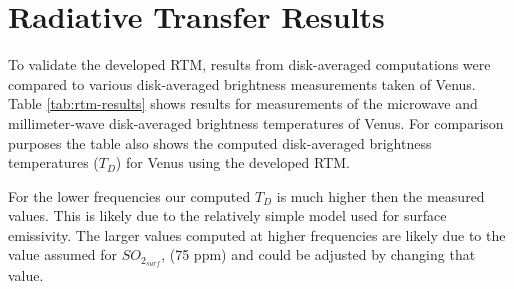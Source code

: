 \section{Radiative Transfer Results}
To validate the developed RTM, results from disk-averaged computations were compared to various disk-averaged brightness measurements taken of Venus. Table \ref{tab:rtm-results} shows results for measurements of the microwave and millimeter-wave disk-averaged brightness temperatures of Venus. For comparison purposes the table also shows the computed disk-averaged brightness temperatures ($T_D$) for Venus using the developed RTM. 

For the lower frequencies our computed $T_D$ is much higher then the measured values. This is likely due to the relatively simple model used for surface emissivity. The larger values computed at higher frequencies are likely due to the value assumed for $SO_{2_{surf}}$, (75 ppm) and could be adjusted by changing that value.%

